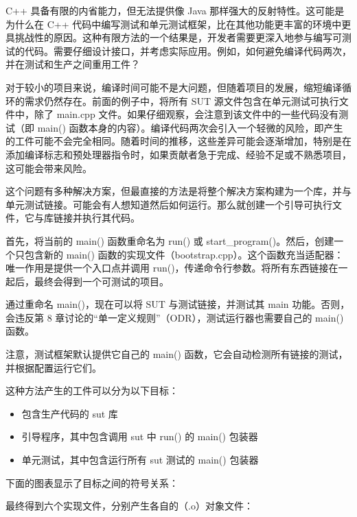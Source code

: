 C++ 具备有限的内省能力，但无法提供像 Java 那样强大的反射特性。这可能是为什么在 C++ 代码中编写测试和单元测试框架，比在其他功能更丰富的环境中更具挑战性的原因。这种有限方法的一个结果是，开发者需要更深入地参与编写可测试的代码。需要仔细设计接口，并考虑实际应用。例如，如何避免编译代码两次，并在测试和生产之间重用工件？

对于较小的项目来说，编译时间可能不是大问题，但随着项目的发展，缩短编译循环的需求仍然存在。前面的例子中，将所有 SUT 源文件包含在单元测试可执行文件中，除了 main.cpp 文件。如果仔细观察，会注意到该文件中的一些代码没有测试（即 main() 函数本身的内容）。编译代码两次会引入一个轻微的风险，即产生的工件可能不会完全相同。随着时间的推移，这些差异可能会逐渐增加，特别是在添加编译标志和预处理器指令时，如果贡献者急于完成、经验不足或不熟悉项目，这可能会带来风险。

这个问题有多种解决方案，但最直接的方法是将整个解决方案构建为一个库，并与单元测试链接。可能会有人想知道然后如何运行。那么就创建一个引导可执行文件，它与库链接并执行其代码。

首先，将当前的 main() 函数重命名为 run() 或 start\_program()。然后，创建一个只包含新的 main() 函数的实现文件（bootstrap.cpp）。这个函数充当适配器：唯一作用是提供一个入口点并调用 run()，传递命令行参数。将所有东西链接在一起后，最终会得到一个可测试的项目。

通过重命名 main()，现在可以将 SUT 与测试链接，并测试其 main 功能。否则，会违反第 8 章讨论的“单一定义规则”（ODR），测试运行器也需要自己的 main() 函数。

注意，测试框架默认提供它自己的 main() 函数，它会自动检测所有链接的测试，并根据配置运行它们。

这种方法产生的工件可以分为以下目标：

\begin{itemize}
\item
包含生产代码的 sut 库

\item
引导程序，其中包含调用 sut 中 run() 的 main() 包装器

\item
单元测试，其中包含运行所有 sut 测试的 main() 包装器
\end{itemize}

下面的图表显示了目标之间的符号关系：


最终得到六个实现文件，分别产生各自的（.o）对象文件：

